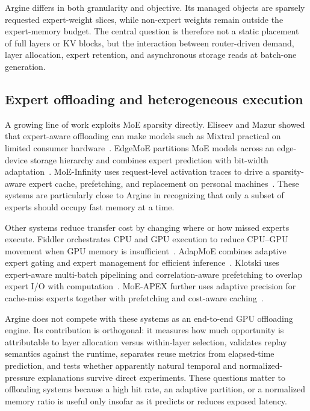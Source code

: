 Argine differs in both granularity and objective. Its managed objects are sparsely requested expert-weight slices, while non-expert weights remain outside the expert-memory budget. The central question is therefore not a static placement of full layers or KV blocks, but the interaction between router-driven demand, layer allocation, expert retention, and asynchronous storage reads at batch-one generation.

\subsection{Expert offloading and heterogeneous execution}

A growing line of work exploits MoE sparsity directly. Eliseev and Mazur showed that expert-aware offloading can make models such as Mixtral practical on limited consumer hardware~\cite{eliseev2023offloading}. EdgeMoE partitions MoE models across an edge-device storage hierarchy and combines expert prediction with bit-width adaptation~\cite{yi2023edgemoe}. MoE-Infinity uses request-level activation traces to drive a sparsity-aware expert cache, prefetching, and replacement on personal machines~\cite{xue2025moeinfinity}. These systems are particularly close to Argine in recognizing that only a subset of experts should occupy fast memory at a time.

Other systems reduce transfer cost by changing where or how missed experts execute. Fiddler orchestrates CPU and GPU execution to reduce CPU--GPU movement when GPU memory is insufficient~\cite{kamahori2025fiddler}. AdapMoE combines adaptive expert gating and expert management for efficient inference~\cite{zhong2024adapmoe}. Klotski uses expert-aware multi-batch pipelining and correlation-aware prefetching to overlap expert I/O with computation~\cite{fang2025klotski}. MoE-APEX further uses adaptive precision for cache-miss experts together with prefetching and cost-aware caching~\cite{tang2026moeapex}.

Argine does not compete with these systems as an end-to-end GPU offloading engine. Its contribution is orthogonal: it measures how much opportunity is attributable to layer allocation versus within-layer selection, validates replay semantics against the runtime, separates reuse metrics from elapsed-time prediction, and tests whether apparently natural temporal and normalized-pressure explanations survive direct experiments. These questions matter to offloading systems because a high hit rate, an adaptive partition, or a normalized memory ratio is useful only insofar as it predicts or reduces exposed latency.

